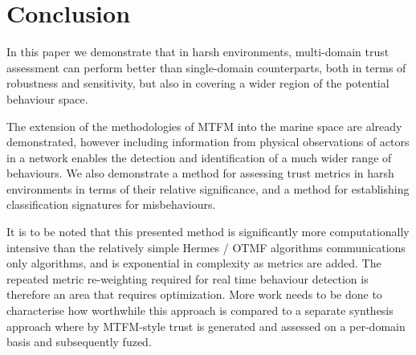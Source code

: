 


\section{Conclusion}
In this paper we demonstrate that in harsh environments, multi-domain trust assessment can perform better than single-domain counterparts, both in terms of robustness and sensitivity, but also in covering a wider region of the potential behaviour space. 

The extension of the methodologies of MTFM into the marine space are already demonstrated, however including information from physical observations of actors in a network enables the detection and identification of a much wider range of behaviours.
We also demonstrate a method for assessing trust metrics in harsh environments in terms of their relative significance, and a method for establishing classification signatures for misbehaviours.

It is to be noted that this presented method is significantly more computationally intensive than the relatively simple Hermes / OTMF algorithms communications only algorithms, and is exponential in complexity as metrics are added. The repeated metric re-weighting required for real time behaviour detection is therefore an area that requires optimization. More work needs to be done to characterise how worthwhile this approach is compared to a separate synthesis approach where by MTFM-style trust is generated and assessed on a per-domain basis and subsequently fuzed.






